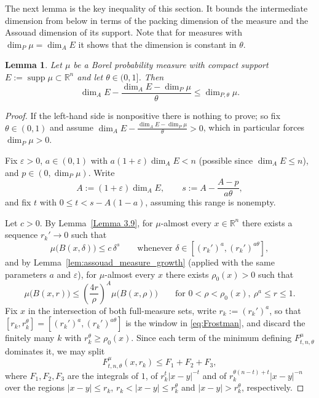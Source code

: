 \documentclass[12pt]{amsart}
\newtheorem{lemma}[theorem]{Lemma}
\theoremstyle{definition}
\theoremstyle{remark}
\numberwithin{equation}{section}
\begin{document}
The next lemma is the key inequality of this section. It bounds the
intermediate dimension from below in terms of the packing dimension of the
measure and the Assouad dimension of its support. Note that for measures with
$\dim_P\mu=\dim_A E$ it shows that the dimension is constant in $\theta$.



\begin{lemma}\label{lem:threshold_lower_bound}
    Let $\mu$ be a Borel probability measure with compact support
    $E:=\operatorname{supp}\mu\subset\mathbb{R}^n$ and let
    $\theta\in(0,1]$. Then
    $$\dim_A E - \frac{\dim_A E - \dim_P \mu}{\theta}\leq \dim_{P,\theta}\mu.$$
\end{lemma}
\begin{proof}
If the left-hand side is
nonpositive there is nothing to prove; so fix $\theta\in(0,1)$ and
assume $\dim_A E-\frac{\dim_A E-\dim_P\mu}{\theta}>0$, which in
particular forces $\dim_P\mu>0$.

Fix $\varepsilon>0$, $a\in(0,1)$ with $a(1+\varepsilon)\dim_A E<n$
(possible since $\dim_A E\leq n$), and $p\in(0,\dim_P\mu)$. Write
$$A:=(1+\varepsilon)\dim_A E,\qquad
s:=A-\frac{A-p}{a\theta},$$
and fix $t$ with $0\leq t<s-A(1-a)$, assuming this range is nonempty.

Let $c>0$. By Lemma~\ref{Lemma 3.9}, for $\mu$-almost every
$x\in\mathbb{R}^n$ there exists a sequence $r_k'\to 0$ such that
\begin{equation}\label{eq:Frostman}
\mu\bigl(B(x,\delta)\bigr)\leq c\,\delta^{s}
\qquad\text{whenever }\delta\in[(r_k')^{a},(r_k')^{a\theta}],
\end{equation}
and by Lemma~\ref{lem:assouad_measure_growth} (applied with the same
parameters $a$ and $\varepsilon$), for $\mu$-almost every $x$ there
exists $\rho_0(x)>0$ such that
\begin{equation}\label{eq:growth}
\mu\bigl(B(x,r)\bigr)\leq\left(\frac{4r}{\rho}\right)^{A}
\mu\bigl(B(x,\rho)\bigr)
\qquad\text{for }0<\rho<\rho_0(x),\ \rho^{a}\leq r\leq 1.
\end{equation}
Fix $x$ in the intersection of both full-measure sets, write
$r_k:=(r_k')^{a}$, so that $[r_k,r_k^{\theta}]=[(r_k')^a,(r_k')^{a\theta}]$
is the window in \eqref{eq:Frostman}, and discard the finitely many $k$
with $r_k^{\theta}\geq\rho_0(x)$. Since each term of the minimum
defining $F_{t,n,\theta}^{\mu}$ dominates it, we may split
$$F_{t,n,\theta}^{\mu}(x,r_k)\leq F_1+F_2+F_3,$$
where $F_1,F_2,F_3$ are the integrals of $1$, of $r_k^t|x-y|^{-t}$ and
of $r_k^{\theta(n-t)+t}|x-y|^{-n}$ over the regions $|x-y|\leq r_k$,
$r_k<|x-y|\leq r_k^{\theta}$ and $|x-y|>r_k^{\theta}$, respectively.


\end{proof}
\end{document}
